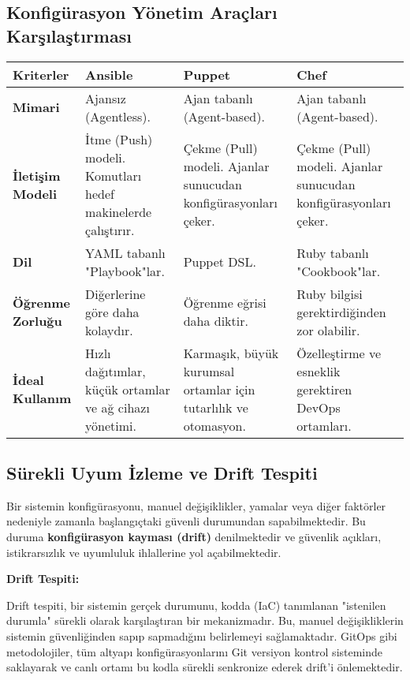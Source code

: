 \subsection{Konfigürasyon Yönetim Araçları Karşılaştırması}

\begin{longtable}{|p{4cm}|p{4cm}|p{4cm}|p{4cm}|}
\hline
\textbf{Kriterler} & \textbf{Ansible} & \textbf{Puppet} & \textbf{Chef} \\
\hline
\textbf{Mimari} & Ajansız (Agentless). & Ajan tabanlı (Agent-based). & Ajan tabanlı (Agent-based). \\
\hline
\textbf{İletişim Modeli} & İtme (Push) modeli. Komutları hedef makinelerde çalıştırır. & Çekme (Pull) modeli. Ajanlar sunucudan konfigürasyonları çeker. & Çekme (Pull) modeli. Ajanlar sunucudan konfigürasyonları çeker. \\
\hline
\textbf{Dil} & YAML tabanlı "Playbook"lar. & Puppet DSL. & Ruby tabanlı "Cookbook"lar. \\
\hline
\textbf{Öğrenme Zorluğu} & Diğerlerine göre daha kolaydır. & Öğrenme eğrisi daha diktir. & Ruby bilgisi gerektirdiğinden zor olabilir. \\
\hline
\textbf{İdeal Kullanım} & Hızlı dağıtımlar, küçük ortamlar ve ağ cihazı yönetimi. & Karmaşık, büyük kurumsal ortamlar için tutarlılık ve otomasyon. & Özelleştirme ve esneklik gerektiren DevOps ortamları. \\
\hline
\end{longtable}

\subsection{Sürekli Uyum İzleme ve Drift Tespiti}

Bir sistemin konfigürasyonu, manuel değişiklikler, yamalar veya diğer faktörler nedeniyle zamanla başlangıçtaki güvenli durumundan sapabilmektedir. Bu duruma \textbf{konfigürasyon kayması (drift)} denilmektedir ve güvenlik açıkları, istikrarsızlık ve uyumluluk ihlallerine yol açabilmektedir.

\textbf{Drift Tespiti:}

Drift tespiti, bir sistemin gerçek durumunu, kodda (IaC) tanımlanan "istenilen durumla" sürekli olarak karşılaştıran bir mekanizmadır. Bu, manuel değişikliklerin sistemin güvenliğinden sapıp sapmadığını belirlemeyi sağlamaktadır. GitOps gibi metodolojiler, tüm altyapı konfigürasyonlarını Git versiyon kontrol sisteminde saklayarak ve canlı ortamı bu kodla sürekli senkronize ederek drift'i önlemektedir.

